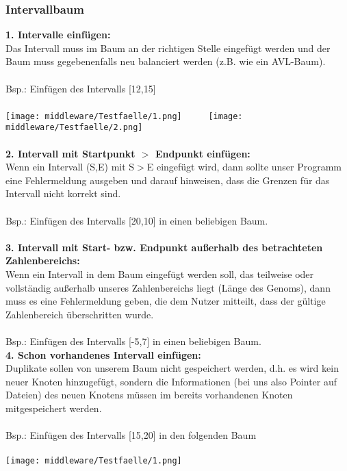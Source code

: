 \subsubsection{Intervallbaum}
\textbf{1. Intervalle einfügen:}\\
Das Intervall muss im Baum an der richtigen Stelle eingefügt werden und der Baum muss gegebenenfalls neu balanciert werden (z.B. wie ein AVL-Baum).\\\\
Bsp.: Einfügen des Intervalls [12,15]\\\\
\texttt{[image: middleware/Testfaelle/1.png]}$~~~~~~~~~~~$
\texttt{[image: middleware/Testfaelle/2.png]}\\\\
\textbf{2. Intervall mit Startpunkt $>$ Endpunkt einfügen:}\\
Wenn ein Intervall (S,E) mit S$>$E eingefügt wird, dann sollte unser Programm eine Fehlermeldung ausgeben und darauf hinweisen, dass die Grenzen für das Intervall nicht korrekt sind.\\\\
Bsp.: Einfügen des Intervalls [20,10] in einen beliebigen Baum.\\\\
\textbf{3. Intervall mit Start- bzw. Endpunkt außerhalb des betrachteten Zahlenbereichs:}\\
Wenn ein Intervall in dem Baum eingefügt werden soll, das teilweise oder vollständig außerhalb unseres Zahlenbereichs liegt (Länge des Genoms), dann muss es eine Fehlermeldung geben, die dem Nutzer mitteilt, dass der gültige Zahlenbereich überschritten wurde.\\\\
Bsp.: Einfügen des Intervalls [-5,7] in einen beliebigen Baum.\newpage\hfill\\
\textbf{4. Schon vorhandenes Intervall einfügen:}\\
Duplikate sollen von unserem Baum nicht gespeichert werden, d.h. es wird kein neuer Knoten hinzugefügt, sondern die Informationen (bei uns also Pointer auf Dateien) des neuen Knotens müssen im bereits vorhandenen Knoten mitgespeichert werden.\\\\
Bsp.: Einfügen des Intervalls [15,20] in den folgenden Baum\\\\
\texttt{[image: middleware/Testfaelle/1.png]}\\
